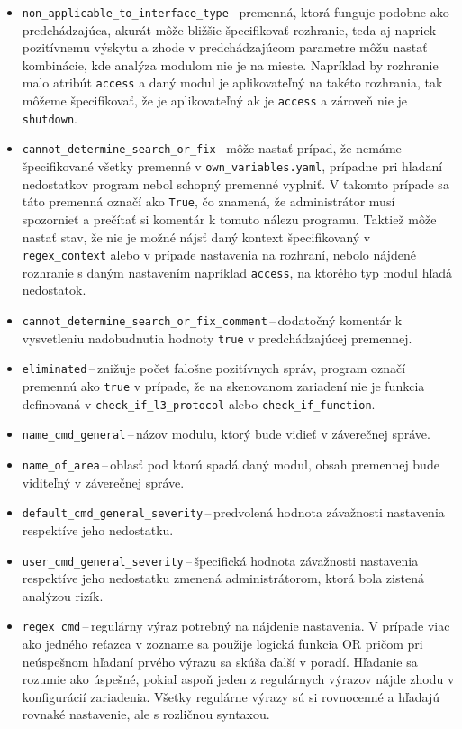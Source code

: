 \begin{itemize}
	\item \texttt{non\_applicable\_to\_interface\_type}\,--\,premenná, ktorá funguje podobne ako predchádzajúca, akurát môže bližšie špecifikovať rozhranie, teda aj napriek pozitívnemu výskytu a zhode v predchádzajúcom parametre môžu nastať kombinácie, kde analýza modulom nie je na mieste. Napríklad by rozhranie malo atribút \texttt{access} a daný modul je aplikovateľný na takéto rozhrania, tak môžeme špecifikovať, že je aplikovateľný ak je \texttt{access} a zároveň nie je \texttt{shutdown}.
	\item \texttt{cannot\_determine\_search\_or\_fix}\,--\,môže nastať prípad, že nemáme špecifikované všetky premenné v \texttt{own\_variables.yaml}, prípadne pri hľadaní nedostatkov program nebol schopný premenné vyplniť. V takomto prípade sa táto premenná označí ako \texttt{True}, čo znamená, že administrátor musí spozornieť a prečítať si komentár k tomuto nálezu programu. Taktiež môže nastať stav, že nie je možné nájsť daný kontext špecifikovaný v \texttt{regex\_context} alebo v prípade nastavenia na rozhraní, nebolo nájdené rozhranie s daným nastavením napríklad \texttt{access}, na ktorého typ modul hľadá nedostatok.
	\item \texttt{cannot\_determine\_search\_or\_fix\_comment}\,--\,dodatočný komentár k vysvetleniu nadobudnutia hodnoty \texttt{true} v predchádzajúcej premennej.
	\item \texttt{eliminated}\,--\,znižuje počet falošne pozitívnych správ, program označí premennú ako \texttt{true} v prípade, že na skenovanom zariadení nie je funkcia definovaná v \texttt{check\_if\_l3\_protocol} alebo \texttt{check\_if\_function}.
	\item \texttt{name\_cmd\_general}\,--\,názov modulu, ktorý bude vidieť v záverečnej správe.
	\item \texttt{name\_of\_area}\,--\,oblasť pod ktorú spadá daný modul, obsah premennej bude viditeľný v záverečnej správe.
	\item \texttt{default\_cmd\_general\_severity}\,--\,predvolená hodnota závažnosti nastavenia respektíve jeho nedostatku. 
	\item \texttt{user\_cmd\_general\_severity}\,--\,špecifická hodnota závažnosti nastavenia respektíve jeho nedostatku zmenená administrátorom, ktorá bola zistená analýzou rizík. 
	\item \texttt{regex\_cmd}\,--\,regulárny výraz potrebný na nájdenie nastavenia. V prípade viac ako jedného reťazca v zozname sa použije logická funkcia OR pričom pri neúspešnom hľadaní prvého výrazu sa skúša ďalší v poradí. Hľadanie sa rozumie ako úspešné, pokiaľ aspoň jeden z regulárnych výrazov nájde zhodu v konfigurácií zariadenia. Všetky regulárne výrazy sú si rovnocenné a hľadajú rovnaké nastavenie, ale s rozličnou syntaxou.

\end{itemize}
